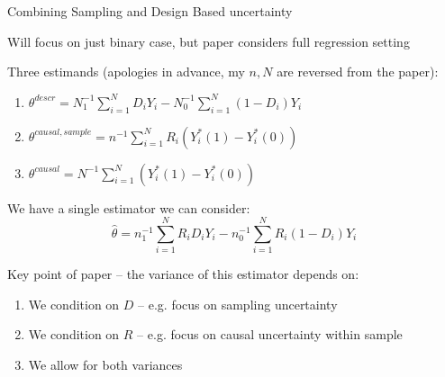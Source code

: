 \documentclass[notes,11pt, aspectratio=169]{beamer}
\newenvironment{wideitemize}{\itemize\addtolength{\itemsep}{10pt}}{\enditemize}
\begin{document}
\begin{frame}{Combining Sampling and Design Based uncertainty}
  \begin{wideitemize}
  \item   Will focus on just binary case, but paper considers full regression setting
  \item   Three estimands (apologies in advance, my $n,N$ are reversed from the paper):
  \begin{enumerate}
  \item $\theta^{descr} = N^{-1}_{1}\sum_{i=1}^{N}D_{i}Y_{i} - N^{-1}_{0}\sum_{i=1}^{N}(1-D_{i})Y_{i}$
  \item $\theta^{causal, sample} = n^{-1}\sum_{i=1}^{N}R_{i}(Y^{*}_{i}(1) - Y_{i}^{*}(0))$
  \item $\theta^{causal} = N^{-1}\sum_{i=1}^{N}(Y^{*}_{i}(1) - Y_{i}^{*}(0))$    
  \end{enumerate}
\item We have a single estimator we can consider:
  \begin{equation*}
    \hat{\theta} = n^{-1}_{1}\sum_{i=1}^{N}R_{i}D_{i}Y_{i} - n^{-1}_{0}\sum_{i=1}^{N}R_{i}(1-D_{i})Y_{i}
  \end{equation*}
\item Key point of paper -- the variance of this estimator depends on:
  \begin{enumerate}
  \item We condition on $D$ -- e.g. focus on sampling uncertainty
  \item We condition on $R$ -- e.g. focus on causal uncertainty within sample
  \item We allow for both variances
  \end{enumerate}
  \end{wideitemize}
\end{frame}
\end{document}
